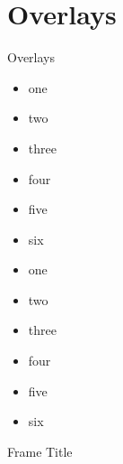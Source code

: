 \documentclass[aspectratio=169]{beamer}
\begin{document}
\section{Overlays}
\begin{frame}[allowframebreaks]{Overlays}
\begin{itemize}
    \item<3-> one %
    \item<1-> two
    \item<5-> three
    \item<6> four %
    \item<2-> five
    \item<4-> six \pause
    \item one
    \item two
    \item three
    \item four
    \item five
    \item six
\end{itemize}    
\end{frame}

\begin{frame}{Frame Title}
    \lipsum[1-1]
\end{frame}
\end{document}
